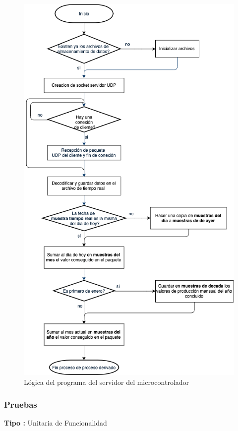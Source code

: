 \begin{figure}[H]
	\centering
	\includegraphics[scale=.5]{Capitulo5/images/logica_server_udp.png}
	\caption{Lógica del programa del servidor del microcontrolador}
	\label{fig:programa del servidor microcontrolador}
\end{figure} 

\subsubsection{Pruebas}
\textbf{Tipo :} Unitaria de Funcionalidad \\ \newline

